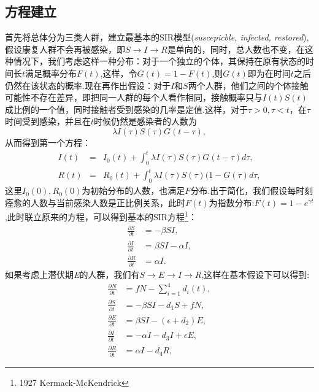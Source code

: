 \documentclass[UTF8]{ctexart}
\begin{document}
			\subsection{方程建立}
				首先将总体分为三类人群，建立最基本的SIR模型(\emph{suscepicble, infected, restored}),假设康复人群不会再被感染，即$S\rightarrow I\rightarrow R$是单向的，同时，总人数也不变，在这种情况下，我们考虑这样一种分布：对于一个独立的个体，其保持在原有状态的时间长$t$满足概率分布$F(t)$,这样，令$G(t)=1-F(t)$,则$G(t)$即为在时间$t$之后仍然在该状态的概率.现在再作出假设：对于$I$和$S$两个人群，他们之间的个体接触可能性不存在差异，即把同一人群的每个人看作相同，接触概率只与$I(t)S(t)$成比例的一个值，同时接触者受到感染的几率是定值.这样，对于$\tau>0,\tau<t$，在$\tau$时间受到感染，并且在$t$时候仍然是感染者的人数为\[\lambda I(\tau)S(\tau)G(t-\tau),\]从而得到第一个方程：
				\begin{eqnarray*} \label{First}
					I(t)&=& I_0(t)+\int_{0}^{t}\lambda I(\tau)S(\tau)G(t-\tau)d\tau,\\
					R(t)&=& R_0(t)+\int_{0}^{t}\lambda I(\tau)S(\tau)(1-G(\tau)d\tau,
				\end{eqnarray*}
				这里$I_0(0),R_0(0)$为初始分布的人数，也满足$F$分布.出于简化，我们假设每时刻痊愈的人数与当前感染人数是正比例关系，此时$F(t)$为指数分布:$F(t)=1-e^{\gamma t}	$,此时联立原来的方程，可以得到基本的SIR方程\footnote{1927 Kermack-McKendrick}：
				\begin{equation}\label{basis}
				\begin{split}
				\frac{\partial S}{\partial t}&=-\beta SI,\\
				\frac{\partial I}{\partial t}&=\beta SI-\alpha I,\\
				\frac{\partial R}{\partial t}&=\alpha I.			
				\end{split}
				\end{equation}
				如果考虑上潜伏期\emph{E}的人群，我们有$S\rightarrow E\rightarrow I\rightarrow R$,这样在基本假设下可以得到:
				\begin{equation}\label{SEIR}
				\begin{split}
				\frac{\partial N}{\partial t}&=fN-\sum_{i=1}^{4}d_i(t),\\
				\frac{\partial S}{\partial t}&=-\beta SI-d_1S+fN,\\
				\frac{\partial E}{\partial t}&=\beta S I-(\epsilon+d_2)E,\\
				\frac{\partial I}{\partial t}&=-\alpha I-d_3I+\epsilon E,\\
				\frac{\partial R}{\partial t}&=\alpha I-d_4R,		
				\end{split}
				\end{equation}
\end{document}
